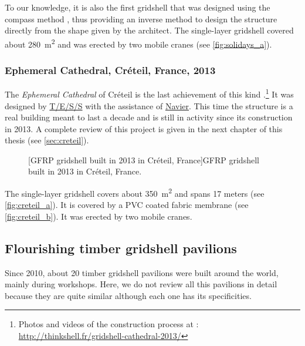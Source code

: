To our knowledge, it is also the first gridshell that was designed using the compass method \cite{IL10}, thus providing an inverse method to design the structure directly from the shape given by the architect. The single-layer gridshell covered about \SI{280}{m^2} and was erected by two mobile cranes (see \cref{fig:solidays_a}).

\subsubsection{Ephemeral Cathedral, Créteil, France, 2013}
The \emph{Ephemeral Cathedral} of Créteil is the last achievement of this kind \cite{DuPeloux2016}.\footnote{Photos and videos of the construction process at : \url{http://thinkshell.fr/gridshell-cathedral-2013/}} It was designed by \href{http://www.tess.fr}{T/E/S/S} with the assistance of \href{http://navier.enpc.fr}{Navier}. This time the structure is a real building meant to last a decade and is still in activity since its construction in 2013. A complete review of this project is given in the next chapter of this thesis (see \cref{sec:creteil}).
\begin{figure}[h]
		\hspace*{\fill}
		\vspace{10pt}
		[GFRP gridshell built in 2013 in Créteil, France]{GFRP gridshell built in 2013 in Créteil, France.}
		\label{fig:creteil}    
\end{figure}

The single-layer gridshell covers about \SI{350}{m^2} and spans 17 meters (see \cref{fig:creteil_a}). It is covered by a PVC coated fabric membrane (see \cref{fig:creteil_b}). It was erected by two mobile cranes.


\subsection{Flourishing timber gridshell pavilions}
Since 2010, about 20 timber gridshell pavilions were built around the world, mainly during workshops. Here, we do not review all this pavilions in detail because they are quite similar although each one has its specificities.

